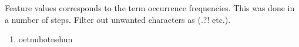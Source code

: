 Feature values corresponds to the term occurrence frequencies.
This was done in a number of steps. Filter out unwanted characters as (.?! etc.).
\begin{enumerate}
\item oetnuhotnehun
\end{enumerate}
